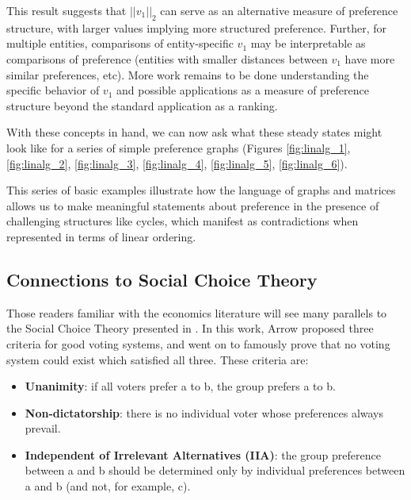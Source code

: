 This result suggests that $||v_1||_2$ can serve as an alternative measure of preference structure, with larger values implying more structured preference.
Further, for multiple entities, comparisons of entity-specific $v_1$ may be interpretable as comparisons of preference (entities with smaller distances between $v_1$ have more similar preferences, etc).
More work remains to be done understanding the specific behavior of $v_1$ and possible applications as a measure of preference structure beyond the standard application as a ranking.

\bigskip

With these concepts in hand, we can now ask what these steady states might look like for a series of simple preference graphs (Figures \ref{fig:linalg_1}, \ref{fig:linalg_2}, \ref{fig:linalg_3}, \ref{fig:linalg_4}, \ref{fig:linalg_5}, \ref{fig:linalg_6}).





This series of basic examples illustrate how the language of graphs and matrices allows us to make meaningful statements about preference in the presence of challenging structures like cycles, which manifest as contradictions when represented in terms of linear ordering.

\FloatBarrier

\subsection{Connections to Social Choice Theory}

Those readers familiar with the economics literature will see many parallels to the Social Choice Theory presented in \cite{arrow}.
In this work, Arrow proposed three criteria for good voting systems, and went on to famously prove that no voting system could exist which satisfied all three.
These criteria are:

\begin{itemize}
	\item \textbf{Unanimity}: if all voters prefer a to b, the group prefers a to b.
	\item \textbf{Non-dictatorship}: there is no individual voter whose preferences always prevail.
	\item \textbf{Independent of Irrelevant Alternatives (IIA)}: the group preference between a and b should be determined only by individual preferences between a and b (and not, for example, c).
\end{itemize}

